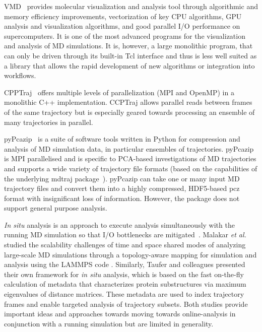VMD~\cite{Hum96, VMD2013} provides molecular visualization and analysis tool through algorithmic and memory efficiency improvements, vectorization of key CPU algorithms, GPU analysis and visualization algorithms, and good parallel I/O performance on supercomputers. It is one of the most advanced programs for the visualization and analysis of MD simulations. It is, however, a large monolithic program, that can only be driven through its built-in Tcl interface and thus is less well suited as a library that allows the rapid development of new algorithms or integration into workflows.

CPPTraj~\cite{cpptraj-2013} offers multiple levels of parallelization (MPI and OpenMP) in a monolithic C++ implementation.
CCPTraj allows parallel reads between frames of the same trajectory but is especially geared towards processing an ensemble of many trajectories in parallel.

pyPcazip~\cite{pyPcazip} is a suite of software tools written in Python for compression and analysis of MD simulation data, in particular ensembles of trajectories. 
pyPcazip is MPI parallelised and is specific to PCA-based investigations of MD trajectories and supports a wide variety of trajectory file formats (based on the capabilities of the underlying mdtraj package~\cite{McGibbon:2015aa}).
pyPcazip can take one or many input MD trajectory files and convert them into a highly compressed, HDF5-based pcz format with insignificant loss of information.
However, the package does not support general purpose analysis.

\textit{In situ} analysis is an approach to execute analysis simultaneously with the running MD simulation so that I/O bottlenecks are  mitigated~\cite{Malakar-etal, Johnston:2017aa}.
Malakar \textit{et al.} studied the scalability challenges of time and space shared modes of analyzing large-scale MD simulations through a topology-aware mapping for simulation and analysis using the LAMMPS code \cite{Malakar-etal}.
Similarly, Taufer and colleagues \cite{Johnston:2017aa} presented their own framework for \textit{in situ} analysis, which is based on the fast on-the-fly calculation of metadata that characterizes protein substructures via maximum eigenvalues of distance matrices.
These metadata are used to index trajectory frames and enable targeted analysis of trajectory subsets.
Both studies provide important ideas and approaches towards moving towards online-analysis in conjunction with a running simulation but are limited in generality.

